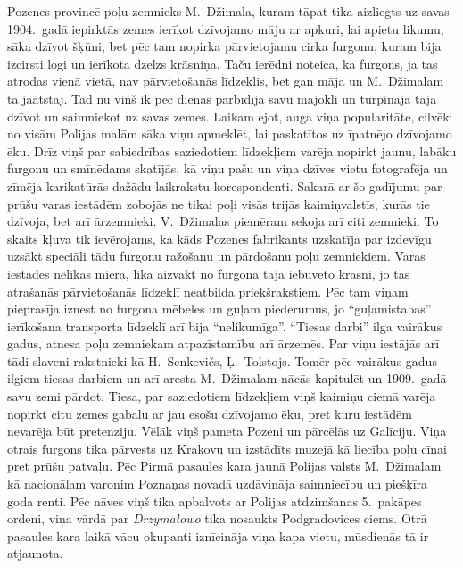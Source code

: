 \documentclass[twoside,a5paper,12pt,fleqn,openany]{extbook}
\newcommand{\pltxti}[1]{\textit{\textpolish{#1}}}
\begin{document}
Pozenes provincē poļu zemnieks M.~Džimala, kuram tāpat tika aizliegts uz savas 1904.~gadā iepirktās zemes ierīkot dzīvojamo māju ar apkuri, lai apietu likumu, sāka dzīvot šķūni, bet pēc tam nopirka pārvietojamu cirka furgonu, kuram bija izcirsti logi un ierīkota dzelzs krāsniņa. Taču ierēdņi noteica, ka furgons, ja tas atrodas vienā vietā, nav pārvietošanās līdzeklis, bet gan māja un M.~Džimalam tā jāatstāj. Tad nu viņš ik pēc dienas pārbīdīja savu mājokli un turpināja tajā dzīvot un saimniekot uz savas zemes. Laikam ejot, auga viņa popularitāte, cilvēki no visām Polijas malām sāka viņu apmeklēt, lai paskatītos uz īpatnējo dzīvojamo ēku. Drīz viņš par sabiedrības saziedotiem līdzekļiem varēja nopirkt jaunu, labāku furgonu un smīnēdams skatījās, kā viņu pašu un viņa dzīves vietu fotografēja un zīmēja karikatūrās dažādu laikrakstu korespondenti. Sakarā ar šo gadījumu par prūšu varas iestādēm zobojās ne tikai poļi visās trijās kaimiņvalstīs, kurās tie dzīvoja, bet arī ārzemnieki. V.~Džimalas piemēram sekoja arī citi zemnieki. To skaits kļuva tik ievērojams, ka kāds Pozenes fabrikants uzskatīja par izdevīgu uzsākt speciāli tādu furgonu ražošanu un pārdošanu poļu zemniekiem. Varas iestādes nelikās mierā, lika aizvākt no furgona tajā iebūvēto krāsni, jo tās atrašanās pārvietošanās līdzeklī neatbilda priekšrakstiem. Pēc tam viņam pieprasīja iznest no furgona mēbeles un guļam piederumus, jo ``guļamistabas'' ierīkošana transporta līdzeklī arī bija ``nelikumīga''. ``Tiesas darbi'' ilga vairākus gadus, atnesa poļu zemniekam atpazīstamību arī ārzemēs. Par viņu iestājās arī tādi slaveni rakstnieki kā H.~Senkevičs, Ļ.~Tolstojs. Tomēr pēc vairākus gadus ilgiem tiesas darbiem un arī aresta M.~Džimalam nācās kapitulēt un 1909.~gadā savu zemi pārdot. Tiesa, par saziedotiem līdzekļiem viņš kaimiņu ciemā varēja nopirkt citu zemes gabalu ar jau esošu dzīvojamo ēku, pret kuru iestādēm nevarēja būt pretenziju. Vēlāk viņš pameta Pozeni un pārcēlās uz Galīciju. Viņa otrais furgons tika pārvests uz Krakovu un izstādīts muzejā kā liecība poļu cīņai pret prūšu patvaļu. Pēc Pirmā pasaules kara jaunā Polijas valsts M.~Džimalam kā nacionālam varonim Poznaņas novadā uzdāvināja saimniecību un piešķīra goda renti. Pēc nāves viņš tika apbalvots ar Polijas atdzimšanas 5.~pakāpes ordeni, viņa vārdā par \pltxti{Drzymałowo} tika nosaukts Podgradovices ciems. Otrā pasaules kara laikā vācu okupanti iznīcināja viņa kapa vietu, mūsdienās tā ir atjaunota.
\end{document}
